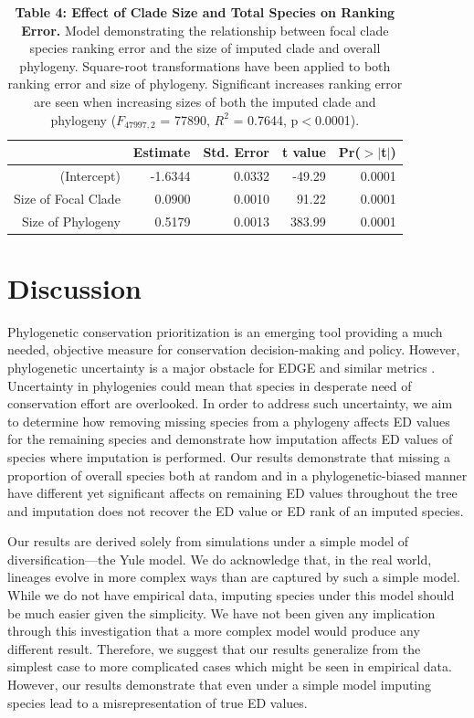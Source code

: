 \documentclass[12pt,english]{article}
\begin{document}
\begin{table}[ht]
  \centering
  \begin{tabular}{rrrrr}
    \hline
   & Estimate & Std. Error & t value & Pr($>$$|$t$|$) \\
    \hline
  (Intercept) & -1.6344 & 0.0332 & -49.29 & 0.0001 \\
    Size of Focal Clade & 0.0900 & 0.0010 & 91.22 & 0.0001 \\
    Size of Phylogeny & 0.5179 & 0.0013 & 383.99 & 0.0001 \\
     \hline
     \hline
  \end{tabular}
  \caption*{\textbf{Table 4: Effect of Clade Size and Total Species on Ranking
  Error.} Model demonstrating the relationship between focal clade species
  ranking error and the size of imputed clade and overall phylogeny. Square-root
  transformations have been applied to both ranking error and size of phylogeny.
  Significant increases ranking error are seen when increasing sizes of both the
  imputed clade and phylogeny ($F_{47997, 2}$ = 77890, $R^{2}$ = 0.7644,
  p$<$0.0001).}
  \end{table}

\clearpage
\section*{Discussion}
Phylogenetic conservation prioritization is an emerging tool providing a much
needed, objective measure for conservation decision-making and policy. However,
phylogenetic uncertainty is a major obstacle for EDGE and similar metrics
\autocite{Collen2015}. Uncertainty in phylogenies could mean that species in
desperate need of conservation effort are overlooked. In order to address such
uncertainty, we aim to determine how removing missing species from a phylogeny
affects ED values for the remaining species and demonstrate how imputation
affects ED values of species where imputation is performed. Our results
demonstrate that missing a proportion of overall species both at random and in a
phylogenetic-biased manner have different yet significant affects on remaining
ED values throughout the tree and imputation does not recover the ED value or ED
rank of an imputed species.

Our results are derived solely from simulations under a simple model of
diversification---the Yule model. We do acknowledge that, in the real world,
lineages evolve in more complex ways than are captured by such a simple model.
While we do not have empirical data, imputing species under this model should be
much easier given the simplicity. We have not been given any implication through
this investigation that a more complex model would produce any different result.
Therefore, we suggest that our results generalize from the simplest case to more
complicated cases which might be seen in empirical data. However, our results
demonstrate that even under a simple model imputing species lead to a
misrepresentation of true ED values. 
\end{document}
